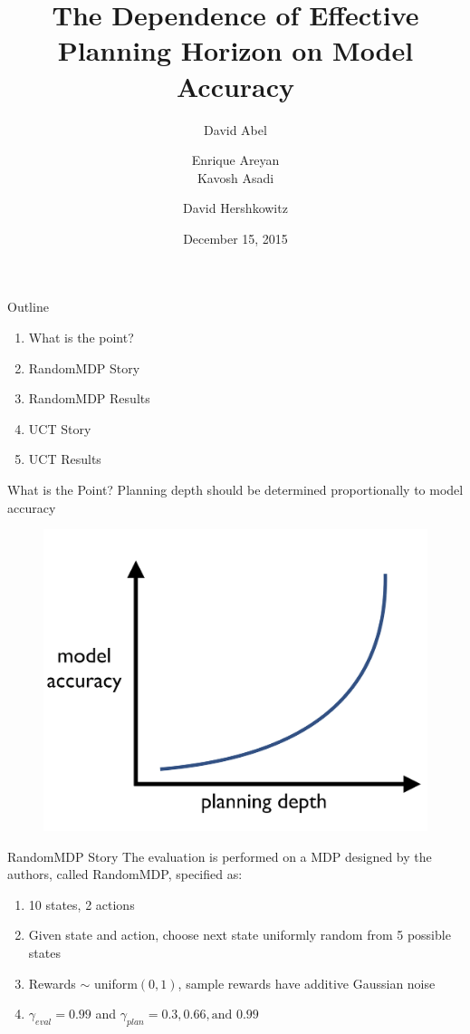\documentclass{beamer}
\title[The Dependence of Planning Horizon on Model Accuracy]{The Dependence of Effective Planning Horizon on Model Accuracy}
\author[]{David Abel  \and Enrique Areyan \\ Kavosh Asadi  \and David Hershkowitz}
\date{December 15, 2015}
\begin{document}
\begin{frame}
\titlepage
\end{frame}

\begin{frame}{Outline}
\begin{enumerate}
	\item What is the point?
	\item RandomMDP Story
	\item RandomMDP Results
	\item UCT Story
	\item UCT Results
\end{enumerate}
\end{frame}

\begin{frame}{What is the Point?}
\centering
Planning depth should be determined proportionally to model accuracy
\begin{figure}
\includegraphics[page=1,width=.5\textwidth]{WhatIsThePoint.png}
\end{figure}
\end{frame}


\begin{frame}{RandomMDP Story}
The evaluation is performed on a MDP designed by the authors, called RandomMDP, specified as:\vspace{8mm}
\begin{enumerate}
\setlength\itemsep{1em}
\item 10 states, 2 actions 
\item Given state and action, choose next state uniformly random from 5 possible states
\item Rewards $\sim$ uniform$(0,1)$, sample rewards have additive Gaussian noise
\item $\gamma_{eval} = 0.99$ and $\gamma_{plan} = 0.3,0.66, \text{and } 0.99$
\end{enumerate}

\end{frame}
\end{document}
